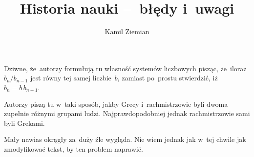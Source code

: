 \documentclass[a4paper,11pt]{article}
\title{Historia nauki --~błędy i~uwagi}
\author{Kamil Ziemian}
\begin{document}



\maketitle %







\start {} Dziwne, że~autorzy formułują tu własność systemów
liczbowych pisząc, że~iloraz $b_{ n } / b_{ n - 1 }$ jest równy tej
samej liczbie~$b$, zamiast po~prostu stwierdzić,
iż~$b_{ n } = b \, b_{ n - 1 }$.

\vspace{\spaceFour}



\start {} Autorzy piszą tu w~taki sposób, jakby Grecy
i~rachmistrzowie byli dwoma zupełnie różnymi grupami ludzi.
Najprawdopodobniej jednak rachmistrzowie sami byli Grekami.

\vspace{\spaceFour}



\start {} Mały nawias okrągły za~duży źle wygląda. Nie
wiem jednak jak w~tej chwile jak zmodyfikować tekst, by ten problem
naprawić.





\end{document}
